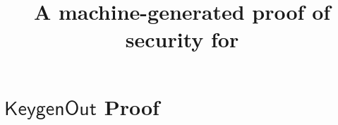 \documentclass[11pt]{article}
\begin{document}


\newtheorem{definition}{Definition}
\newtheorem{theorem}{Theorem}
\newcommand{\Oracle}{\mathcal{O}}
\newcommand{\Adv}{\mathcal{A}}
\newcommand{\Bdv}{\mathcal{B}}
\newcommand{\MS}{\mathcal{M}}
\newcommand{\Psetup}{\mathsf{PSetup}}
\newcommand{\Msetup}{\mathsf{Setup}}
\newcommand{\params}{\mathit{params}}
\newcommand{\brk}[1]{\langle #1 \rangle}
\newcommand{\ait}[1]{#1}
\newcommand{\Ga}{\ait{\mathbb{G}}_1}
\newcommand{\ga}{\ait{g}_1}
\newcommand{\ha}{\ait{h}_1}
\newcommand{\poly}{\mathrm{poly}}

\newcommand{\bit}[1]{#1}
\newcommand{\Gb}{\bit{\mathbb{G}}_2}
\newcommand{\gb}{\bit{g}_2}
\newcommand{\hb}{\bit{h}_2}

\newcommand{\cit}[1]{#1}
\newcommand{\Gc}{\cit{\Group_T}}
\newcommand{\gc}{\cit{g}}
\newcommand{\hc}{\cit{h}}
\newcommand{\Zp}{\mathbb{Z}_p}

\newcommand{\Group}{\ensuremath{\mathbb{G}}\xspace}
\newcommand{\Hroup}{\ensuremath{\mathbb{H}}\xspace}
\newcommand{\map}{\mathbf{e}}

\newcommand{\prot}{\mathsf{Prot}}
\newcommand{\auxext}{\mathit{auxext}}
\newcommand{\auxsim}{\mathit{auxsim}}
\newcommand{\aux}{\mathit{aux}}
\newcommand{\state}{\mathit{state}}
\newcommand{\Alg}{\mathsf{Alg}}
\newcommand{\A}{\mathcal{A}}

\newcommand{\Sig}{\mathsf{Sig}}
\newcommand{\G}{\mathsf{Gen}}
\newcommand{\TK}{\mathsf{TK}}
\newcommand{\pseudokey}{{\sf TK}_{sim}}
\newcommand{\SK}{\mathsf{SK}}
\newcommand{\PK}{\mathsf{PK}}
\newcommand{\MSK}{\mathsf{MSK}}
\newcommand{\CT}{\mathsf{CT}}
\newcommand{\Screen}{\mathsf{Screen}}
\newcommand{\Setup}{\mathsf{Setup}}
\newcommand{\Keygen}{\mathsf{Keygen}}
\newcommand{\KeygenOut}{\mathsf{KeygenOut}}
\newcommand{\Transform}{\mathsf{Transform}}
\newcommand{\Decrypt}{\mathsf{Decrypt}}
\newcommand{\Decout}{\mathsf{DecOut}}
\newcommand{\compareequals}{\stackrel{?}{=}}
\newcommand{\numsigs}{\eta}

\title{A machine-generated proof of security for {\schemename}}
\author{}
\date{}
\maketitle

\section{$\KeygenOut$ Proof}
\end{document}
